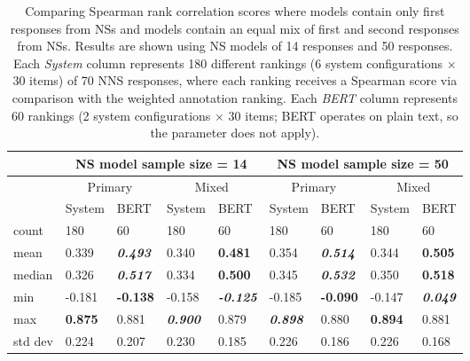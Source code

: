 \begin{table}[htb!]
\begin{center}
\begin{tabular}{|l||l|l||l|l||l|l||l|l|}
\hline
 & \multicolumn{4}{c||}{NS model sample size = 14} & \multicolumn{4}{c|}{NS model sample size = 50} \\
 \hline
 & \multicolumn{2}{c||}{Primary} & \multicolumn{2}{c||}{Mixed} & \multicolumn{2}{c||}{Primary} & \multicolumn{2}{c|}{Mixed} \\
\hline
			& System 		& BERT 		& System 	& BERT 						& System 		& BERT 				& System 			& BERT \\
\hline
\hline
count 		& 180 			& 60 		& 180 		& 60 						& 180 			& 60 				& 180 				& 60 \\
\hline
mean 		& 0.339 & \textit{\textbf{0.493}} 	& 0.340 	& \textbf{0.481} 	& 0.354 	& \textit{\textbf{0.514}} 	& 0.344 	& \textbf{0.505} \\
\hline
median 	& 0.326 & \textit{\textbf{0.517}} & 0.334 	& \textbf{0.500}  			& 0.345 	& \textit{\textbf{0.532}} 	& 0.350 	& \textbf{0.518}  \\
\hline
min 	& -0.181 & \textbf{-0.138} 		& -0.158 	& \textit{\textbf{-0.125}}  & -0.185 	& \textbf{-0.090} 		& -0.147 		& \textit{\textbf{0.049}}  \\
\hline
max & \textbf{0.875} & 0.881 & \textit{\textbf{0.900}} & 0.879 					& \textit{\textbf{0.898}} & 0.880 	& \textbf{0.894} 	& 0.881 \\
\hline
std dev & 0.224 			& 0.207 	& 0.230 	& 0.185 					& 0.226 	& 0.186 					& 0.226 		& 0.168 \\
\hline
\end{tabular}
\caption{\label{tab:primacy-results} Comparing Spearman rank correlation scores where  models contain only first responses from NSs and  models contain an equal mix of first and second responses from NSs. Results are shown using NS models of 14 responses and 50 responses. Each \textit{System} column represents 180 different rankings (6 system configurations $\times$ 30 items) of 70 NNS responses, where each ranking receives a Spearman score via comparison with the weighted annotation ranking. Each \textit{BERT} column represents 60 rankings (2 system configurations $\times$ 30 items; BERT operates on plain text, so the  parameter does not apply).
}
\end{center}
\end{table}


